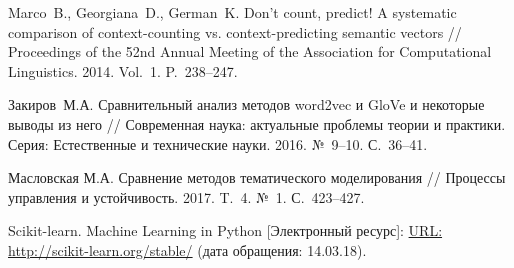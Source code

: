 \documentclass[12pt]{article}
\begin{document}
\begin{thebibliography}{99}
   Marco~B., Georgiana~D., German~K. Don’t count, predict! A systematic comparison of context-counting vs. context-predicting semantic vectors //  Proceedings of the 52nd Annual Meeting of the Association for Computational Linguistics. 2014. Vol.~1. P.~238--247.

  Закиров~М.\:А. Сравнительный анализ методов word2vec и GloVe и некоторые выводы из него // Современная наука: актуальные проблемы теории и практики. Серия: Естественные и технические науки. 2016. №~9--10. С.~36--41.

 Масловская М.\:А. Сравнение методов тематического моделирования // Процессы управления и устойчивость. 2017. T.~4. №~1. С.~423--427.

  Scikit-learn. Machine Learning in Python [Электронный ресурс]: \url{URL: http://scikit-learn.org/stable/} (дата обращения: 14.03.18).

\end{thebibliography}
\end{document}
